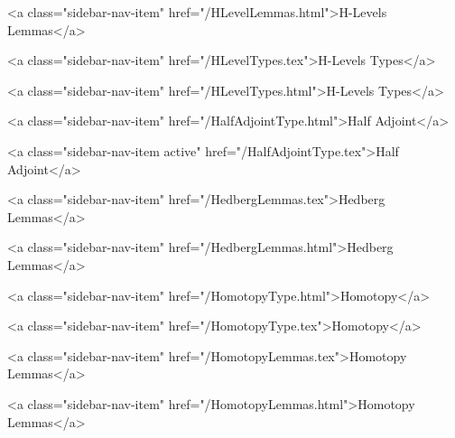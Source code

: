       
        
          <a class="sidebar-nav-item" href="/HLevelLemmas.html">H-Levels Lemmas</a>
        
      
    
      
        
          <a class="sidebar-nav-item" href="/HLevelTypes.tex">H-Levels Types</a>
        
      
    
      
        
          <a class="sidebar-nav-item" href="/HLevelTypes.html">H-Levels Types</a>
        
      
    
      
        
          <a class="sidebar-nav-item" href="/HalfAdjointType.html">Half Adjoint</a>
        
      
    
      
        
          <a class="sidebar-nav-item active" href="/HalfAdjointType.tex">Half Adjoint</a>
        
      
    
      
        
          <a class="sidebar-nav-item" href="/HedbergLemmas.tex">Hedberg Lemmas</a>
        
      
    
      
        
          <a class="sidebar-nav-item" href="/HedbergLemmas.html">Hedberg Lemmas</a>
        
      
    
      
        
          <a class="sidebar-nav-item" href="/HomotopyType.html">Homotopy</a>
        
      
    
      
        
          <a class="sidebar-nav-item" href="/HomotopyType.tex">Homotopy</a>
        
      
    
      
        
          <a class="sidebar-nav-item" href="/HomotopyLemmas.tex">Homotopy Lemmas</a>
        
      
    
      
        
          <a class="sidebar-nav-item" href="/HomotopyLemmas.html">Homotopy Lemmas</a>
        
      
    
